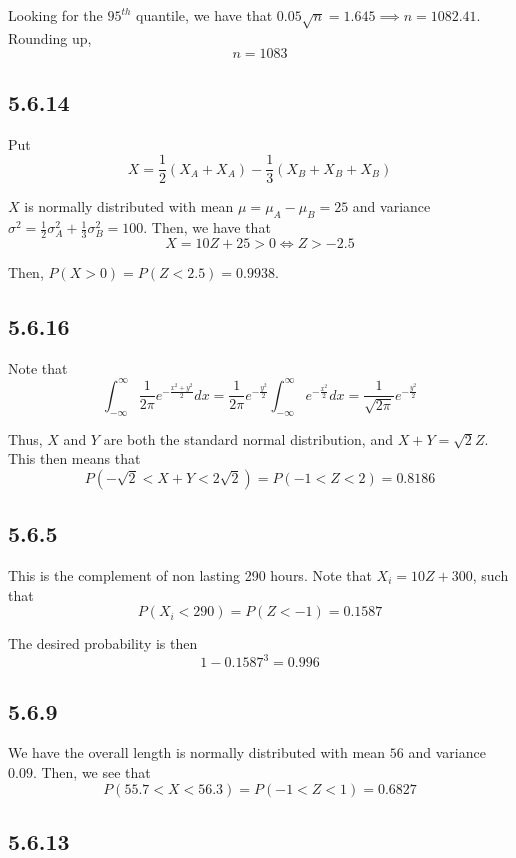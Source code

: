 \documentclass[12pt,letterpaper]{article}
\theoremstyle{definition}
\begin{document}
Looking for the $95^{th}$ quantile, we have that $0.05\sqrt{n} = 1.645 \implies
n = 1082.41$. Rounding up,
\[
  n = 1083
\]

\subsection*{5.6.14}

Put
\[
  X = \frac{1}{2}(X_A + X_A) - \frac{1}{3}(X_B + X_B + X_B)
\]

$X$ is normally distributed with mean $\mu = \mu_A - \mu_B = 25$ and variance
$\sigma^2 = \frac{1}{2}\sigma_A^2 + \frac{1}{3}\sigma_B^2 = 100$. Then, we have
that
\[
  X = 10Z + 25 > 0 \iff Z > -2.5
\]

Then, $P(X > 0) = P(Z < 2.5) = 0.9938$.

\subsection*{5.6.16}

Note that
\[
  \int_{-\infty}^\infty\frac{1}{2\pi}e^{-\frac{x^2+y^2}{2}}dx =
  \frac{1}{2\pi}e^{-\frac{y^2}{2}}\int_{-\infty}^\infty e^{-\frac{x^2}{2}}dx = \frac{1}{\sqrt{2\pi}}e^{-\frac{y^2}{2}}
\]

Thus, $X$ and $Y$ are both the standard normal distribution, and $X + Y =
\sqrt{2}Z$. This then means that
\[
  P(-\sqrt{2} < X + Y < 2\sqrt{2}) = P(-1 < Z < 2) = 0.8186
\]

\subsection*{5.6.5}

This is the complement of non lasting 290 hours. Note that $X_i = 10Z + 300$,
such that
\[
  P(X_i < 290) = P(Z < -1) = 0.1587
\]

The desired probability is then
\[
  1 - 0.1587^3 = 0.996
\]

\subsection*{5.6.9}

We have the overall length is normally distributed with mean $56$ and variance
$0.09$. Then, we see that
\[
  P(55.7 < X < 56.3) = P(-1 < Z < 1) = 0.6827
\]

\subsection*{5.6.13}
\end{document}
